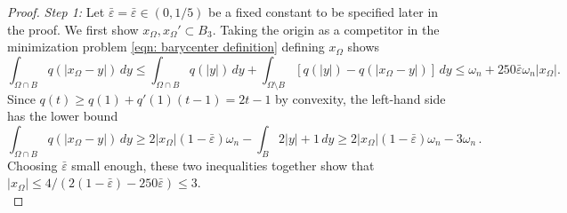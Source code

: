 \documentclass[10pt,a4paper]{amsart}
\numberwithin{equation}{section}
\def\e{\varepsilon}
\def\w{\omega}
\def\W{\Omega}
\def\baryEps{\bar{\e}}
\def\TBF{q}
\begin{document}
\begin{proof}
{\it Step 1:}	Let $\baryEps=\baryEps\in(0,1/5)$ be a fixed constant to be specified later in the proof. We first show $x_\W, x_\W' \subset B_3$. Taking the origin as a competitor in the minimization problem \eqref{eqn: barycenter definition} defining $x_\W$ shows 
	\[
	\int_{\W \cap B} \TBF(|x_\W-y|)\,dy \leq \int_{\W \cap B} \TBF(|y|)\,dy +  \int_{\W \setminus B} [ \TBF(|y|) - \TBF(|x_\W-y|) ] \,dy\leq \w_n + 250 \baryEps \omega_n |x_\W|.
	\]
Since $\TBF(t) \geq \TBF(1)+ \TBF'(1)(t-1) = 2t-1$ by convexity, the left-hand side has the lower bound
\[
\int_{\W \cap B} \TBF(|x_\W-y|)\,dy \geq 2|x_\W|(1-\baryEps) \omega_n - \int_{B} 2|y|+1 \, dy \geq 2|x_\W|(1-\baryEps) \omega_n - 3\omega_n\,.
\]
Choosing $\baryEps$ small enough, these two inequalities together show that $|x_\W| \leq 4/(2(1-\baryEps) -250\baryEps) \leq 3.$\\


\end{proof}
\end{document}
